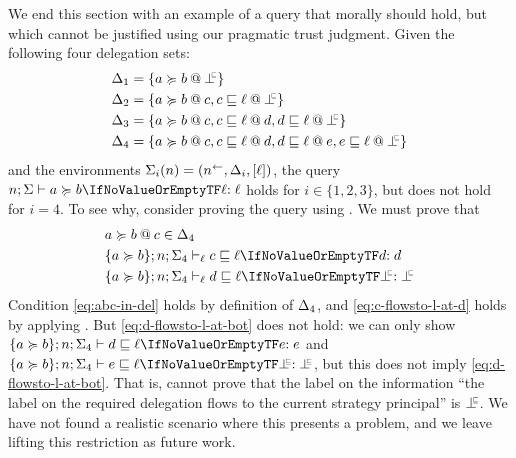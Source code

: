 We end this section with an example of a query that morally should hold, but which cannot be justified using our pragmatic trust judgment. Given the following four delegation sets:
\begin{align*}
\scope_1 &= \{ \lb{\botinfoflow}{a \actsfor b} \} \\
\scope_2 &= \{ \lb{c}{a \actsfor b}, \lb{\botinfoflow}{c \flowsto \level} \} \\
\scope_3 &= \{ \lb{c}{a \actsfor b}, \lb{d}{c \flowsto \level}, \lb{\botinfoflow}{d \flowsto \level} \} \\
\scope_4 &= \{ \lb{c}{a \actsfor b}, \lb{d}{c \flowsto \level}, \lb{e}{d \flowsto \level}, \lb{\botinfoflow}{e \flowsto \level} \}
\end{align*}
and the environments $\Sigma_i(n) = (n^{\leftarrow}, \Delta_i, \lbrack \ell \rbrack)$, the query $\actsforquery{n; \env}{a}{b}{\level}$ holds for $i \in \{1, 2, 3\}$, but does not hold for $i = 4$. To see why, consider proving the query using . We must prove that
\begin{align}
\label{eq:abc-in-del} &\lb{c}{a \actsfor b} \in \scope_4\\
\label{eq:c-flowsto-l-at-d} &\flowstoquery{\{a \actsfor b\}; n; \env_4}[\level]{c}{\level}{d}\\
\label{eq:d-flowsto-l-at-bot} &\flowstoquery{\{a \actsfor b\}; n; \env_4}[\level]{d}{\level}{\botinfoflow}
\end{align}
Condition \eqref{eq:abc-in-del} holds by definition of $\Delta_4$, and \eqref{eq:c-flowsto-l-at-d} holds by applying . But \eqref{eq:d-flowsto-l-at-bot} does not hold: we can only show $\flowstoquery{\{a \actsfor b\}; n; \env_4}{d}{\level}{e}$ and $\flowstoquery{\{a \actsfor b\}; n; \env_4}{e}{\level}{\botinfoflow}$, but this does not imply \eqref{eq:d-flowsto-l-at-bot}. That is, \lang{} cannot prove that the label on the information ``the label on the required delegation flows to the current strategy principal'' is $\botinfoflow$. We have not found a realistic scenario where this presents a problem, and we leave lifting this restriction as future work.


